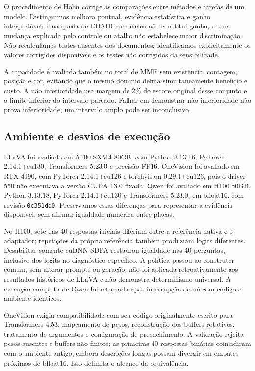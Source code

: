 O procedimento de Holm corrige as comparações entre métodos e tarefas de um modelo. Distinguimos melhora pontual, evidência estatística e ganho interpretável: uma queda de CHAIR com ciclos não constitui ganho, e uma mudança explicada pelo controle ou atalho não estabelece maior discriminação. Não recalculamos testes ausentes dos documentos; identificamos explicitamente os valores corrigidos disponíveis e os testes não corrigidos da sensibilidade.

A capacidade é avaliada também no total de MME sem existência, contagem, posição e cor, evitando que o mesmo domínio defina simultaneamente benefício e custo. A não inferioridade usa margem de 2\% do escore original desse conjunto e o limite inferior do intervalo pareado. Falhar em demonstrar não inferioridade não prova inferioridade; um intervalo amplo pode ser inconclusivo.

\subsection{Ambiente e desvios de execução}
LLaVA foi avaliado em A100-SXM4-80GB, com Python 3.13.16, PyTorch 2.14.1+cu130, Transformers 5.23.0 e precisão FP16. OneVision foi avaliado em RTX 4090, com PyTorch 2.14.1+cu126 e torchvision 0.29.1+cu126, pois o driver 550 não executava a versão CUDA 13.0 fixada. Qwen foi avaliado em H100 80GB, Python 3.13.18, PyTorch 2.14.1+cu130 e Transformers 5.23.0, em bfloat16, com revisão \texttt{0c351dd0}. Preservamos essas diferenças para representar a evidência disponível, sem afirmar igualdade numérica entre placas.

No H100, sete das 40 respostas iniciais diferiam entre a referência nativa e o adaptador; repetições da própria referência também produziam logits diferentes. Desabilitar somente cuDNN SDPA restaurou igualdade nas 40 perguntas, inclusive dos logits no diagnóstico específico. A política passou ao construtor comum, sem alterar prompts ou geração; não foi aplicada retroativamente aos resultados históricos de LLaVA e não demonstra determinismo universal. A execução completa de Qwen foi retomada após interrupção do nó com código e ambiente idênticos.

OneVision exigiu compatibilidade com seu código originalmente escrito para Transformers 4.53: mapeamento de pesos, reconstrução dos buffers rotativos, tratamento de argumentos e configuração de preenchimento. A validação rejeita pesos ausentes e buffers não finitos; as primeiras 40 respostas binárias coincidiram com o ambiente antigo, embora descrições longas possam divergir em empates próximos de bfloat16. Isso delimita o alcance da equivalência.

